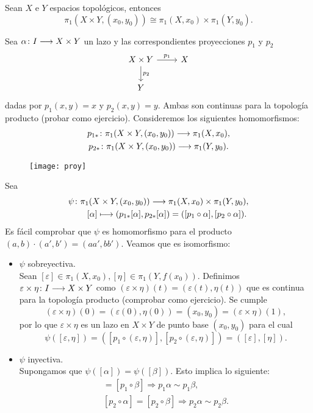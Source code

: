\documentclass[GTS.tex]{subfiles}
\begin{document}
\begin{prop} Sean $X$ e $Y$ espacios topológicos, entonces
\[
\pi_1(X\times Y, (x_0,y_0))\cong\pi_1(X,x_0)\times\pi_1(Y,y_0).
\]
\end{prop}
\begin{dem}
Sea $\alpha\colon{I}\longrightarrow{X\times Y}$ un lazo y las correspondientes proyecciones $p_1$ y $p_2$
\[
\begin{tikzcd}
X\times Y \ar[r, "p_1"]\ar[d, "p_2"] & X\\
Y
\end{tikzcd}
\]
dadas por $p_1(x,y)=x$ y $p_2(x,y)=y$. Ambas son continuas para la topología producto (probar como ejercicio). Consideremos los siguientes homomorfismos:
\begin{gather*}
p_{1*}\colon{\pi_1(X\times Y, (x_0,y_0))}\longrightarrow{\pi_1(X,x_0)},\\
p_{2*}\colon{\pi_1(X\times Y, (x_0,y_0))}\longrightarrow{\pi_1(Y,y_0)}.
\end{gather*}

\begin{figure}[h!]
	\texttt{[image: proy]}
\end{figure}

Sea
\begin{gather*}
\psi\colon{\pi_1(X\times Y, (x_0,y_0))}\longrightarrow{\pi_1(X,x_0)\times\pi_1(Y,y_0)},\\
\qquad[\alpha]\longmapsto(p_{1*}[\alpha],p_{2*}[\alpha])=([p_1\circ\alpha],[p_2\circ\alpha]).
\end{gather*}
Es fácil comprobar que $\psi$ es homomorfismo para el producto $(a,b)\cdot(a',b')=(aa',bb')$. Veamos que es isomorfismo:
\begin{itemize}
\item $\psi$ sobreyectiva.\\
Sean $[\varepsilon]\in\pi_1(X,x_0),[\eta]\in\pi_1(Y,f(x_0))$. Definimos $\varepsilon\times\eta\colon{I}\longrightarrow{X\times Y}$ como $(\varepsilon\times\eta)(t)=(\varepsilon(t),\eta(t))$ que es continua para la topología producto (comprobar como ejercicio). Se cumple
\[
(\varepsilon\times\eta)(0)=(\varepsilon(0),\eta(0))=(x_0,y_0)=(\varepsilon\times\eta)(1),
\]
por lo que $\varepsilon\times\eta$ es un lazo en $X\times Y$ de punto base $(x_0,y_0)$ para el cual
\[
\psi([\varepsilon,\eta])=([p_1\circ(\varepsilon,\eta)],[p_2\circ(\varepsilon,\eta)])=([\varepsilon],[\eta]).
\]
\item $\psi$ inyectiva.\\
Supongamos que $\psi([\alpha])=\psi([\beta])$. Esto implica lo siguiente:
\begin{gather*}
[p_1\circ\alpha]=[p_1\circ\beta]\Rightarrow p_1\alpha\sim p_1\beta,\\
[p_2\circ\alpha]=[p_2\circ\beta]\Rightarrow p_2\alpha\sim p_2\beta.
\end{gather*}


\end{itemize}
\end{dem}
\end{document}
